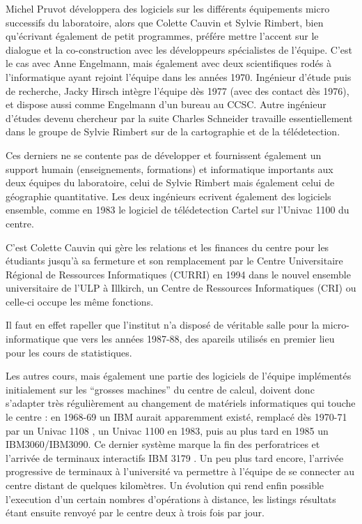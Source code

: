 Michel Pruvot développera des logiciels sur les différents équipements micro successifs du laboratoire, alors que Colette Cauvin et Sylvie Rimbert, bien qu'écrivant également de petit programmes, préfére mettre l'accent sur le dialogue et la co-construction avec les développeurs spécialistes de l'équipe. C'est le cas avec Anne Engelmann, mais également avec deux scientifiques rodés à l'informatique ayant rejoint l'équipe dans les années 1970. Ingénieur d'étude puis de recherche, Jacky Hirsch intègre l'équipe dès 1977 (avec des contact dès 1976), et dispose aussi comme Engelmann d'un bureau au CCSC. Autre ingénieur d'études devenu chercheur par la suite Charles Schneider travaille essentiellement dans le groupe de Sylvie Rimbert sur de la cartographie et de la télédetection.

Ces derniers ne se contente pas de développer et fournissent également un support humain (enseignements, formations) et informatique importants aux deux équipes du laboratoire, celui de Sylvie Rimbert mais également celui de géographie quantitative. Les deux ingénieurs ecrivent également des logiciels ensemble, comme en 1983 le logiciel de télédetection Cartel sur l'Univac 1100 du centre. 

C'est Colette Cauvin qui gère les relations et les finances du centre pour les étudiants jusqu'à sa fermeture et son remplacement par le Centre Universitaire Régional de Ressources Informatiques (CURRI) en 1994 dans le nouvel ensemble universitaire de l'ULP à Illkirch, un Centre de Ressources Informatiques (CRI) ou celle-ci occupe les même fonctions.

Il faut en effet rapeller que l'institut n'a disposé de véritable salle pour la micro-informatique que vers les années 1987-88, des apareils utilisés en premier lieu pour les cours de statistiques.

Les autres cours, mais également une partie des logiciels de l'équipe implémentés initialement sur les \enquote{grosses machines} du centre de calcul, doivent donc s'adapter très régulièrement au changement de matériels informatiques qui touche le centre : en 1968-69 un IBM aurait apparemment existé, remplacé dès 1970-71 par un Univac 1108 \textcite{Dalmasso1971}, un Univac 1100 en 1983, puis au plus tard en 1985 un IBM3060/IBM3090. Ce dernier système marque la fin des perforatrices et l'arrivée de terminaux interactifs IBM 3179 \autocites{Rimbert1984,Cauvin1986}. Un peu plus tard encore, l'arrivée progressive de terminaux à l'université va permettre à l'équipe de se connecter au centre distant de quelques kilomètres. Un évolution qui rend enfin possible l'execution d'un certain nombres d'opérations à distance, les listings résultats étant ensuite renvoyé par le centre deux à trois fois par jour. 

